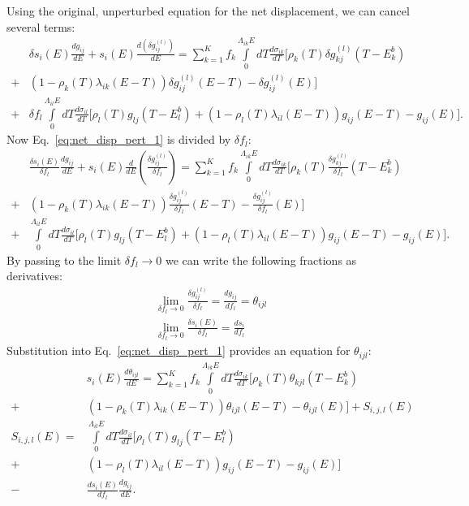 \documentclass[review]{elsarticle}
\begin{document}
Using the original, unperturbed equation for the net displacement, we can cancel several terms:
\begin{align}\label{eq:net_disp_pert_0}
& \delta s_i(E)  \frac{d g_{ij}}{dE}  +  s_i(E)\frac{d (\delta g_{ij}^{(l)})}{dE} 
   = \sum\limits_{k=1}^K  f_k \int\limits_{0}^{\Lambda_{ik} E} dT \frac{d \sigma_{ik}}{dT} \Bigg [   \rho_k(T) \delta g_{kj}^{(l)}(T-E_k^b)   
 \nonumber \\
 +& (1 - \rho_k(T) \lambda_{ik}(E-T) ) \delta g_{ij}^{(l)}(E-T)  - \delta g_{ij}^{(l)}(E) \Bigg ] \nonumber \\
 +&\delta   f_l   \int\limits_{0}^{\Lambda_{il} E} dT \frac{d \sigma_{il}}{dT} \Bigg [  \rho_l(T) g_{lj}(T-E_l^b)   + (1 - \rho_l(T) \lambda_{il}(E-T) ) g_{ij}(E-T)  - g_{ij}(E) \Bigg ] .
\end{align}
Now Eq.~\ref{eq:net_disp_pert_1} is divided by $\delta f_l$:
\begin{align}\label{eq:net_disp_pert_1}
& \frac{\delta s_i(E)}{\delta f_l}  \frac{d g_{ij}}{dE}  +  s_i(E)\frac{d}{dE} \left( \frac{ \delta g_{ij}^{(l)}}{\delta f_l} \right) 
   = \sum\limits_{k=1}^K  f_k \int\limits_{0}^{\Lambda_{ik} E} dT \frac{d \sigma_{ik}}{dT} \Bigg [   \rho_k(T)   \frac{\delta g_{kj}^{(l)}}{\delta f_l}(T-E_k^b)   
 \nonumber \\
 +& (1 - \rho_k(T) \lambda_{ik}(E-T) ) \frac{\delta g_{ij}^{(l)}}{{\delta f_l}}(E-T)  - \frac{\delta g_{ij}^{(l)}}{{\delta f_l}}(E) \Bigg ] \nonumber \\
 +&  \int\limits_{0}^{\Lambda_{il} E} dT \frac{d \sigma_{il}}{dT} \Bigg [  \rho_l(T) g_{lj}(T-E_l^b)   + (1 - \rho_l(T) \lambda_{il}(E-T) ) g_{ij}(E-T)  - g_{ij}(E) \Bigg ] .
\end{align}
By passing to the limit $\delta f_l \rightarrow 0$ we can write the following fractions as derivatives:
\begin{align}
  \lim\limits_{\delta f_l \rightarrow 0} \frac{ \delta g_{ij}^{(l)}}{\delta f_l} = \frac{d g_{ij}}{d f_l} = \theta_{ijl} \nonumber \\
  \lim\limits_{\delta f_l \rightarrow 0} \frac{\delta s_i(E)}{\delta f_l} = \frac{d s_i}{d f_l}
\end{align}
Substitution into Eq.~\ref{eq:net_disp_pert_1} provides an equation for $\theta_{ijl}$:
\begin{align}\label{eq:net_disp_pert_final}
&   s_i(E)\frac{d \theta_{ijl}}{dE}  
   = \sum\limits_{k=1}^K  f_k \int\limits_{0}^{\Lambda_{ik} E} dT \frac{d \sigma_{ik}}{dT} \Bigg [   \rho_k(T) \theta_{kjl}(T-E_k^b)   
 \nonumber \\
 +& (1 - \rho_k(T) \lambda_{ik}(E-T) )  \theta_{ijl}(E-T)  -\theta_{ijl}(E) \Bigg ]  + S_{i,j,l}(E)\nonumber \\
 S_{i,j,l}(E)=&  \int\limits_{0}^{\Lambda_{il} E} dT \frac{d \sigma_{il}}{dT} \Bigg [  \rho_l(T) g_{lj}(T-E_l^b)    \nonumber \\ 
 +& (1 - \rho_l(T) \lambda_{il}(E-T) ) g_{ij}(E-T)  - g_{ij}(E) \Bigg ] \nonumber \\
 -& \frac{ds_i(E)}{d f_l}  \frac{d g_{ij}}{dE}.
\end{align}
\end{document}
